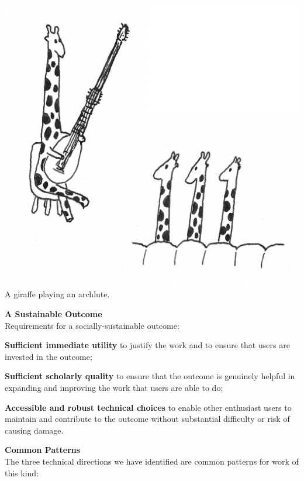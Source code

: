\documentclass[a0,portrait]{a0poster}
\begin{document}
\begin{multicols}{3}
\begin{sloppypar}
  \begin{center}
    \includegraphics[width=0.8\columnwidth]{images/giraffe-archlute-2}\\
    \vspace{-1cm}
  {\small A giraffe playing an archlute.}
    \vspace{1cm}
  \end{center}
  
  \vspace{1cm}
  \noindent\textbf{\LARGE A Sustainable Outcome}\\

  \noindent Requirements for a socially-sustainable outcome:

  \noindent \textbf{Sufficient immediate utility} to justify the work
  and to ensure that users are invested in the outcome;

  \noindent \textbf{Sufficient scholarly quality} to ensure that the
  outcome is genuinely helpful in expanding and improving the work
  that users are able to do;
  
  \noindent \textbf{Accessible and robust technical choices} to enable
    other enthusiast users to maintain and contribute to the outcome
    without substantial difficulty or risk of causing damage.
    
  \vspace{2cm}
  \noindent\textbf{\LARGE Common Patterns}\\

  \noindent The three technical directions we have identified are
  common patterns for work of this kind:


\end{sloppypar}
\end{multicols}
\end{document}
